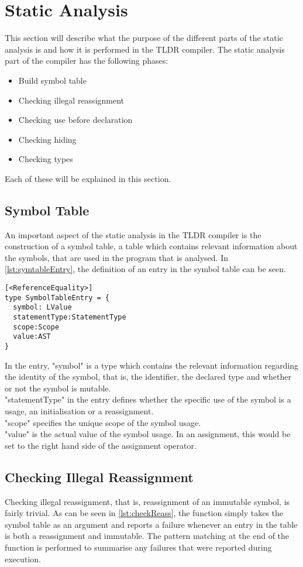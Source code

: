 \section{Static Analysis}
This section will describe what the purpose of the different parts of the static analysis is and how it is performed in the TLDR compiler.
The static analysis part of the compiler has the following phases:
\begin{itemize}
\item Build symbol table
\item Checking illegal reassignment
\item Checking use before declaration
\item Checking hiding
\item Checking types
\end{itemize}
Each of these will be explained in this section.
\subsection{Symbol Table}
An important aspect of the static analysis in the TLDR compiler is the construction of a symbol table, a table which contains relevant information about the symbols, that are used in the program that is analysed.
In \cref{lst:symtableEntry}, the definition of an entry in the symbol table can be seen.
\begin{lstlisting}[style = fsharp, label = lst:symtableEntry, caption = {The definition of an entry in the symbol table}]
[<ReferenceEquality>]
type SymbolTableEntry = {
  symbol: LValue
  statementType:StatementType
  scope:Scope
  value:AST
}
\end{lstlisting}
In the entry, "symbol" is a type which contains the relevant information regarding the identity of the symbol, that is, the identifier, the declared type and whether or not the symbol is mutable.\\
"statementType" in the entry defines whether the specific use of the symbol is a usage, an initialisation or a reassignment.\\
"scope" specifies the unique scope of the symbol usage.\\
"value" is the actual value of the symbol usage. In an assignment, this would be set to the right hand side of the assignment operator.\\

\subsection{Checking Illegal Reassignment}
Checking illegal reassignment, that is, reassignment of an immutable symbol, is fairly trivial. As can be seen in \cref{lst:checkReass}, the function simply takes the symbol table as an argument and reports a failure whenever an entry in the table is both a reassignment and immutable.
The pattern matching at the end of the function is performed to summarise any failures that were reported during execution.

